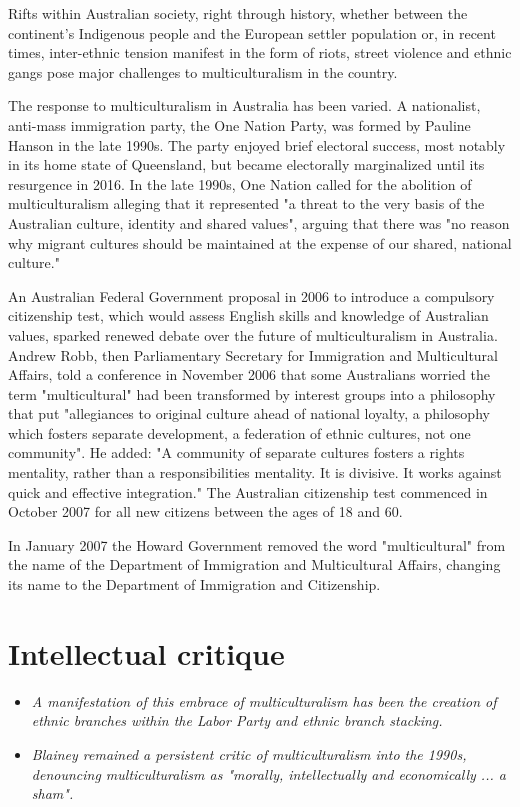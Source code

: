Rifts within Australian society, right through history, whether between
the continent's Indigenous people and the European settler population
or, in recent times, inter-ethnic tension manifest in the form of riots,
street violence and ethnic gangs pose major challenges to
multiculturalism in the country.

The response to multiculturalism in Australia has been varied. A
nationalist, anti-mass immigration party, the One Nation Party, was
formed by Pauline Hanson in the late 1990s. The party enjoyed brief
electoral success, most notably in its home state of Queensland, but
became electorally marginalized until its resurgence in 2016. In the
late 1990s, One Nation called for the abolition of multiculturalism
alleging that it represented "a threat to the very basis of the
Australian culture, identity and shared values", arguing that there was
"no reason why migrant cultures should be maintained at the expense of
our shared, national culture."

An Australian Federal Government proposal in 2006 to introduce a
compulsory citizenship test, which would assess English skills and
knowledge of Australian values, sparked renewed debate over the future
of multiculturalism in Australia. Andrew Robb, then Parliamentary
Secretary for Immigration and Multicultural Affairs, told a conference
in November 2006 that some Australians worried the term "multicultural"
had been transformed by interest groups into a philosophy that put
"allegiances to original culture ahead of national loyalty, a philosophy
which fosters separate development, a federation of ethnic cultures, not
one community". He added: "A community of separate cultures fosters a
rights mentality, rather than a responsibilities mentality. It is
divisive. It works against quick and effective integration." The
Australian citizenship test commenced in October 2007 for all new
citizens between the ages of 18 and 60.

In January 2007 the Howard Government removed the word "multicultural"
from the name of the Department of Immigration and Multicultural
Affairs, changing its name to the Department of Immigration and
Citizenship.

\section{Intellectual critique}\label{intellectual-critique}

\begin{itemize}
\item
  \emph{A manifestation of this embrace of multiculturalism has been the
  creation of ethnic branches within the Labor Party and ethnic branch
  stacking.}
\item
  \emph{Blainey remained a persistent critic of multiculturalism into
  the 1990s, denouncing multiculturalism as "morally, intellectually and
  economically ... a sham".}
\end{itemize}

